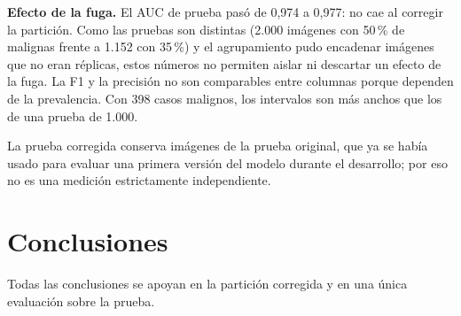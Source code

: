 \documentclass[conference]{IEEEtran}
\begin{document}
	\textbf{Efecto de la fuga.} El AUC de prueba pasó de 0,974 a 0,977: no cae al corregir la partición. Como las pruebas son distintas (2.000 imágenes con 50\,\% de malignas frente a 1.152 con 35\,\%) y el agrupamiento pudo encadenar imágenes que no eran réplicas, estos números no permiten aislar ni descartar un efecto de la fuga. La F1 y la precisión no son comparables entre columnas porque dependen de la prevalencia. Con 398 casos malignos, los intervalos son más anchos que los de una prueba de 1.000.
	
	La prueba corregida conserva imágenes de la prueba original, que ya se había usado para evaluar una primera versión del modelo durante el desarrollo; por eso no es una medición estrictamente independiente.
	
	\section{Conclusiones}
	
	Todas las conclusiones se apoyan en la partición corregida y en una única evaluación sobre la prueba.
	
\end{document}
